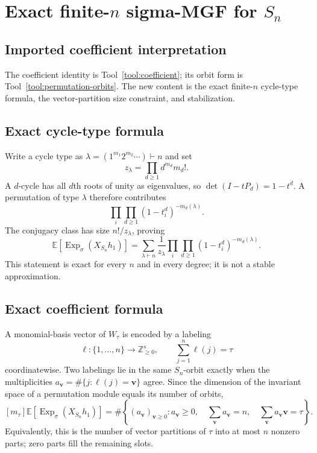 \documentclass[10pt]{article}
\newcommand{\Sym}{\operatorname{Sym}}
\newcommand{\ExpS}{\operatorname{Exp}_{\sigma}}
\newcommand{\smg}[1]{\mathbb E\!\left[\ExpS\!\left(X_{#1}h_1\right)\right]}
\begin{document}
\section[Exact finite-n sigma-MGF for S-n]{Exact finite-$n$ sigma-MGF for $S_n$}\label{proof:symmetric-exact}
\begingroup
{}
\providecommand{\Sym}{\operatorname{Sym}}
\renewcommand{\Sym}{\operatorname{Sym}}
\setcounter{theorem}{0}
\setcounter{proposition}{0}
\setcounter{lemma}{0}
\setcounter{corollary}{0}
\setcounter{remark}{0}
\begin{abstract}
For the permutation representation $V=\mathbb C^n$, this note proves the exact
cycle-type formula for $\smg{S_n}$, identifies its coefficients with vector
partitions, and explains the stable range.  The accompanying marimo notebook
constructs all permutation matrices and compares a full Reynolds-projector
rank with both formulas.  All representative tests passed.
\end{abstract}

\subsection{Imported coefficient interpretation}
The coefficient identity is Tool~\ref{tool:coefficient}; its orbit form is
Tool~\ref{tool:permutation-orbits}. The new content is the exact finite-$n$
cycle-type formula, the vector-partition size constraint, and stabilization.

\subsection{Exact cycle-type formula}
Write a cycle type as $\lambda=(1^{m_1}2^{m_2}\cdots)\vdash n$ and set
\[
 z_\lambda=\prod_{d\ge1}d^{m_d}m_d!.
\]
A $d$-cycle has all $d$th roots of unity as eigenvalues, so
$\det(I-tP_d)=1-t^d$.  A permutation of type $\lambda$ therefore contributes
\[
 \prod_i\prod_{d\ge1}(1-t_i^d)^{-m_d(\lambda)}.
\]
The conjugacy class has size $n!/z_\lambda$, proving
\[
 \boxed{\smg{S_n}=\sum_{\lambda\vdash n}\frac1{z_\lambda}
 \prod_i\prod_{d\ge1}(1-t_i^d)^{-m_d(\lambda)}.}
\]
This statement is exact for every $n$ and in every degree; it is not a stable
approximation.

\subsection{Exact coefficient formula}
A monomial-basis vector of $W_\tau$ is encoded by a labeling
\[
 \ell:\{1,\ldots,n\}\longrightarrow\mathbb Z_{\ge0}^s,
 \qquad \sum_{j=1}^n\ell(j)=\tau
\]
coordinatewise.  Two labelings lie in the same $S_n$-orbit exactly when the
multiplicities
$a_{\mathbf v}=\#\{j:\ell(j)=\mathbf v\}$ agree.  Since the dimension of the
invariant space of a permutation module equals its number of orbits,
\[
 \boxed{[m_\tau]\smg{S_n}=\#\left\{(a_{\mathbf v})_{\mathbf v\ge0}:
 a_{\mathbf v}\ge0,\quad \sum_{\mathbf v}a_{\mathbf v}=n,\quad
 \sum_{\mathbf v}a_{\mathbf v}\mathbf v=\tau\right\}.}
\]
Equivalently, this is the number of vector partitions of $\tau$ into at most
$n$ nonzero parts; zero parts fill the remaining slots.
\end{document}
